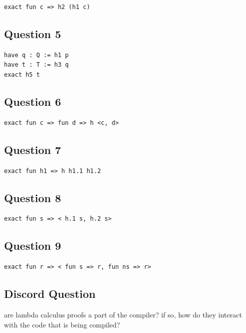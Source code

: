 \documentclass{article}
\theoremstyle{plain}
\theoremstyle{definition}
\theoremstyle{remark}
\begin{document}
\begin{lstlisting}
exact fun c => h2 (h1 c)
\end{lstlisting}

\subsection{Question 5}

\begin{lstlisting}
have q : Q := h1 p
have t : T := h3 q
exact h5 t
\end{lstlisting}

\subsection{Question 6}

\begin{lstlisting}
exact fun c => fun d => h <c, d>
\end{lstlisting}

\subsection{Question 7}

\begin{lstlisting}
exact fun h1 => h h1.1 h1.2
\end{lstlisting}

\subsection{Question 8}

\begin{lstlisting}
exact fun s => < h.1 s, h.2 s>
\end{lstlisting}

\subsection{Question 9}

\begin{lstlisting}
exact fun r => < fun s => r, fun ns => r>
\end{lstlisting}

\subsection{Discord Question}

are lambda calculus proofs a part of the compiler? if so, how do they interact with the code that is being compiled?
\end{document}
